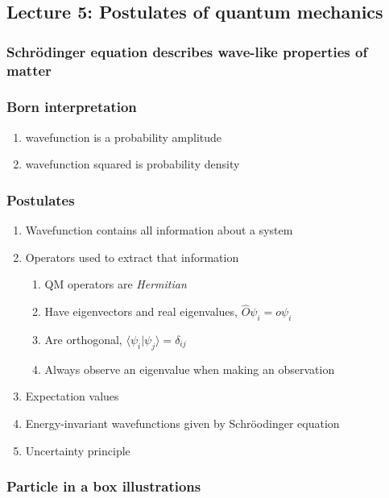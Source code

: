 \documentclass[11pt]{article}
\begin{document}
\subsection{Lecture 5: Postulates of quantum mechanics}
\label{sec:org0af02a9}
\subsubsection{Schr\"{o}dinger equation describes wave-like properties of matter}
\label{sec:org0af7844}
\subsubsection{Born interpretation}
\label{sec:org47eb4d1}
\begin{enumerate}
\item wavefunction is a probability amplitude
\item wavefunction squared is probability density
\end{enumerate}
\subsubsection{Postulates}
\label{sec:org0676ab8}
\begin{enumerate}
\item Wavefunction contains all information about a system
\item Operators used to extract that information
\begin{enumerate}
\item QM operators are \emph{Hermitian}
\item Have eigenvectors and real eigenvalues, \(\hat{O}\psi_i=o\psi_i\)
\item Are orthogonal, \(\langle \psi_i | \psi_j \rangle = \delta_{ij}\)
\item Always observe an eigenvalue when making an observation
\end{enumerate}
\item Expectation values
\item Energy-invariant wavefunctions given by Schr\"{o}odinger equation
\item Uncertainty principle
\end{enumerate}
\subsubsection{Particle in a box illustrations}
\label{sec:orgf7300e0}
\end{document}
